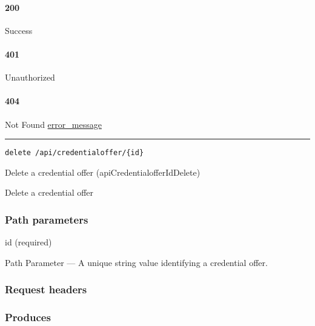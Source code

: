 \hypertarget{section-383}{%
\paragraph{200}\label{section-383}}

Success

\hypertarget{section-384}{%
\paragraph{401}\label{section-384}}

Unauthorized \protect\hyperlink{}{}

\hypertarget{section-385}{%
\paragraph{404}\label{section-385}}

Not Found \protect\hyperlink{error_message}{error\_message}

\begin{center}\rule{0.5\linewidth}{\linethickness}\end{center}

\protect\hypertarget{apiCredentialofferIdDelete}{}{}

\begin{verbatim}
delete /api/credentialoffer/{id}
\end{verbatim}

Delete a credential offer ({apiCredentialofferIdDelete})

Delete a credential offer

\hypertarget{path-parameters-61}{%
\subsubsection{Path parameters}\label{path-parameters-61}}

id (required)

{Path Parameter} --- A unique string value identifying a credential
offer.

\hypertarget{request-headers-66}{%
\subsubsection{Request headers}\label{request-headers-66}}

\hypertarget{produces-115}{%
\subsubsection{Produces}\label{produces-115}}

